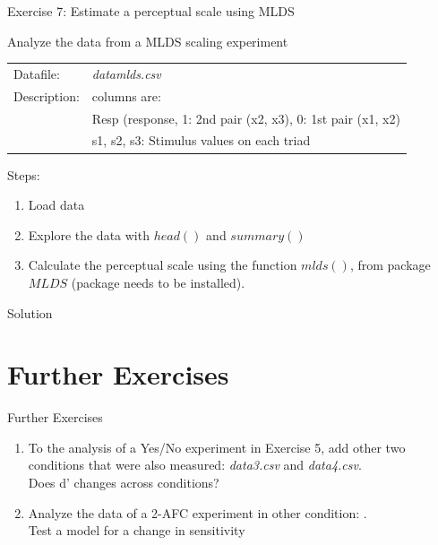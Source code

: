 \documentclass[10pt]{beamer}
\begin{document}
\begin{frame}[fragile]{Exercise 7: Estimate a perceptual scale using MLDS}

Analyze the data from a MLDS scaling experiment

\begin{tabular}{ll}
Datafile: & \textit{datamlds.csv}\\
Description: & columns are: \\
& Resp (response, 1: 2nd pair (x2, x3), 0: 1st pair (x1, x2)\\
& s1, s2, s3: Stimulus values on each triad\\
\end{tabular}

\vspace{10pt}

Steps:
\begin{enumerate}
\item Load data
\item Explore the data with $head()$ and $summary()$
\item Calculate the perceptual scale using the function $mlds()$, from package $MLDS$ (package needs to be installed).
\end{enumerate}

\pause
\begin{center}
Solution
\end{center}
\end{frame}


\section{Further Exercises}
\begin{frame}{Further Exercises}

\begin{enumerate}
\item To the analysis of a Yes/No experiment in Exercise 5, add other two conditions that were also measured: \textit{data3.csv} and \textit{data4.csv}. \\
Does d' changes across conditions?

\item Analyze the data of a 2-AFC experiment in other condition: .\\
Test a model for a change in sensitivity

\end{enumerate}

\end{frame}
\end{document}
